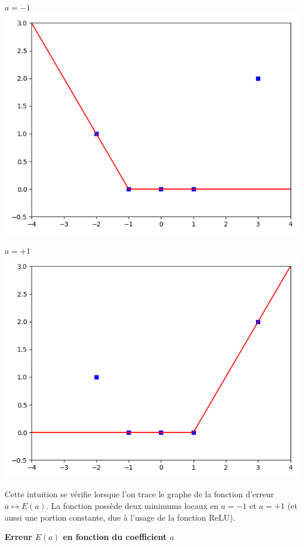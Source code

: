 {\begin{center}
	\begin{minipage}{0.45\textwidth}
		\center \textbf{$a=-1$}
		\includegraphics[scale=\myscale,scale=0.45]{figures/retro_04_b}
	\end{minipage}
	\begin{minipage}{0.45\textwidth}
		\center \textbf{$a=+1$}
		\includegraphics[scale=\myscale,scale=0.45]{figures/retro_04_c}
	\end{minipage}
\end{center}

Cette intuition se vérifie lorsque l'on trace le graphe de la fonction d'erreur $a \mapsto E(a)$. La fonction possède deux minimums locaux en $a=-1$ et $a=+1$ (et aussi une portion constante, due à l'usage de la fonction ReLU).
\begin{center}
	\textbf{Erreur $E(a)$ en fonction du coefficient $a$}
	

\end{center}}
